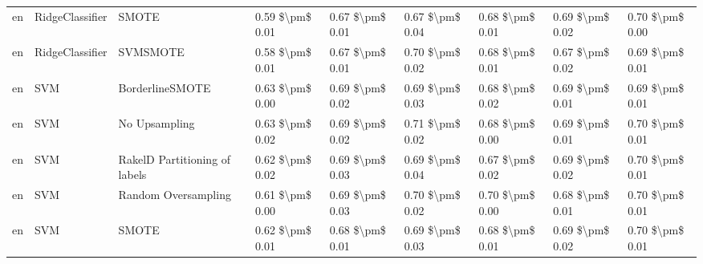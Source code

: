 \begin{tabular}{lllllllll}
      en &                 RidgeClassifier &                         SMOTE & 0.59 \$\textbackslash pm\$ 0.01 &           0.67 \$\textbackslash pm\$ 0.01 &       0.67 \$\textbackslash pm\$ 0.04 &        0.68 \$\textbackslash pm\$ 0.01 &                         0.69 \$\textbackslash pm\$ 0.02 &     0.70 \$\textbackslash pm\$ 0.00 \\
      en &                 RidgeClassifier &                      SVMSMOTE & 0.58 \$\textbackslash pm\$ 0.01 &           0.67 \$\textbackslash pm\$ 0.01 &       0.70 \$\textbackslash pm\$ 0.02 &        0.68 \$\textbackslash pm\$ 0.01 &                         0.67 \$\textbackslash pm\$ 0.02 &     0.69 \$\textbackslash pm\$ 0.01 \\
      en &                             SVM &               BorderlineSMOTE & 0.63 \$\textbackslash pm\$ 0.00 &           0.69 \$\textbackslash pm\$ 0.02 &       0.69 \$\textbackslash pm\$ 0.03 &        0.68 \$\textbackslash pm\$ 0.02 &                         0.69 \$\textbackslash pm\$ 0.01 &     0.69 \$\textbackslash pm\$ 0.01 \\
      en &                             SVM &                 No Upsampling & 0.63 \$\textbackslash pm\$ 0.02 &           0.69 \$\textbackslash pm\$ 0.02 &       0.71 \$\textbackslash pm\$ 0.02 &        0.68 \$\textbackslash pm\$ 0.00 &                         0.69 \$\textbackslash pm\$ 0.01 &     0.70 \$\textbackslash pm\$ 0.01 \\
      en &                             SVM & RakelD Partitioning of labels & 0.62 \$\textbackslash pm\$ 0.02 &           0.69 \$\textbackslash pm\$ 0.03 &       0.69 \$\textbackslash pm\$ 0.04 &        0.67 \$\textbackslash pm\$ 0.02 &                         0.69 \$\textbackslash pm\$ 0.02 &     0.70 \$\textbackslash pm\$ 0.01 \\
      en &                             SVM &           Random Oversampling & 0.61 \$\textbackslash pm\$ 0.00 &           0.69 \$\textbackslash pm\$ 0.03 &       0.70 \$\textbackslash pm\$ 0.02 &        0.70 \$\textbackslash pm\$ 0.00 &                         0.68 \$\textbackslash pm\$ 0.01 &     0.70 \$\textbackslash pm\$ 0.01 \\
      en &                             SVM &                         SMOTE & 0.62 \$\textbackslash pm\$ 0.01 &           0.68 \$\textbackslash pm\$ 0.01 &       0.69 \$\textbackslash pm\$ 0.03 &        0.68 \$\textbackslash pm\$ 0.01 &                         0.69 \$\textbackslash pm\$ 0.02 &     0.70 \$\textbackslash pm\$ 0.01 \\

\end{tabular}
